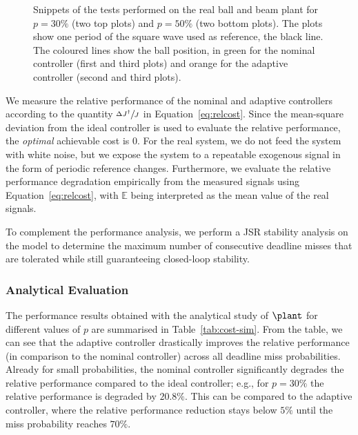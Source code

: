 \begin{figure*}
    \centering
    
    \vspace{-3mm}
    \caption{Snippets of the tests performed on the real ball and beam plant for $p=30\%$ (two top plots) and $p=50\%$ (two bottom plots).
        The plots show one period of the square wave used as reference, the black line.
        The coloured lines show the ball position, in green for the nominal controller (first and third plots) and orange for the adaptive controller (second and third plots).}
    \label{fig:real-plant}
\end{figure*}

We measure the relative performance of the nominal and adaptive controllers according to the quantity $\sfrac{\Delta J^\dagger}{J}$ in Equation~\eqref{eq:relcost}.
Since the mean-square deviation from the ideal controller is used to evaluate the relative performance, the \emph{optimal} achievable cost is $0$.
For the real system, we do not feed the system with white noise, but we expose the system to a repeatable exogenous signal in the form of periodic reference changes. 
Furthermore, we evaluate the relative performance degradation empirically from the measured signals using Equation~\eqref{eq:relcost}, with $\mathbb{E}$ being interpreted as the mean value of the real signals.

To complement the performance analysis, we perform a JSR stability analysis on the model to determine the maximum number of consecutive deadline misses that are tolerated while still guaranteeing closed-loop stability.

\subsubsection*{Analytical Evaluation}
The performance results obtained with the analytical study of $\plant$ for different values of $p$ are summarised in Table~\ref{tab:cost-sim}.
From the table, we can see that the adaptive controller drastically improves the relative performance (in comparison to the nominal controller) across all deadline miss probabilities.
Already for small probabilities, the nominal controller significantly degrades the relative performance compared to the ideal controller; e.g., for $p = 30\%$ the relative performance is degraded by $20.8\%$. This can be compared to the  adaptive controller, where the relative performance reduction stays below $5\%$ until the miss probability reaches $70\%$.

